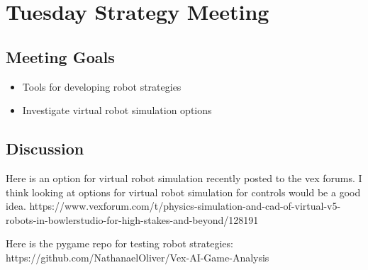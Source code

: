 \section{Tuesday Strategy Meeting}

\subsection{Meeting Goals}
\begin{itemize}
    \item Tools for developing robot strategies
    \item Investigate virtual robot simulation options
\end{itemize}

\subsection{Discussion}
Here is an option for virtual robot simulation recently posted to the vex forums. I think looking at options for virtual robot simulation for controls would be a good idea.
https://www.vexforum.com/t/physics-simulation-and-cad-of-virtual-v5-robots-in-bowlerstudio-for-high-stakes-and-beyond/128191

Here is the pygame repo for testing robot strategies:
https://github.com/NathanaelOliver/Vex-AI-Game-Analysis
